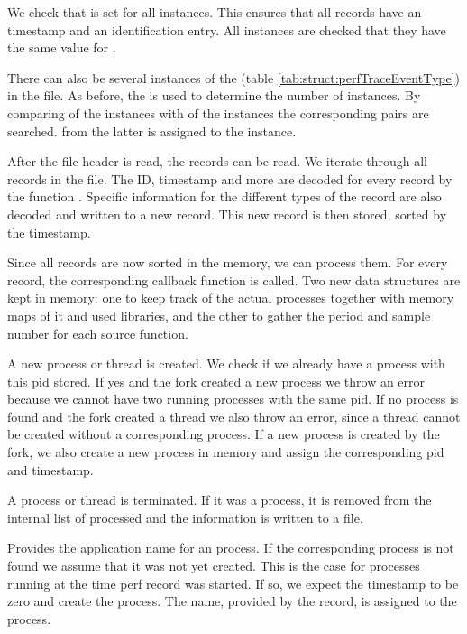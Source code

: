 We check that  is set for all instances. This ensures that all records have an timestamp and an identification entry. All instances are checked that they have the same value for .

There can also be several instances of the  (table \ref{tab:struct:perfTraceEventType}) in the file. As before, the  is used to determine the number of instances. By comparing  of the  instances with  of the  instances the corresponding pairs are search\-ed.  from the latter is assigned to the  instance.

After the file header is read, the records can be read. We iterate through all records in the file. The ID, timestamp and more are decoded for every record by the function . Specific information for the different types of the record are also decoded and written to a new record. This new record is then stored, sorted by the timestamp.

Since all records are now sorted in the memory, we can process them. For every record, the corresponding callback function is called. Two new data structures are kept in memory: one to keep track of the actual processes together with memory maps of it and used libraries, and the other to gather the period and sample number for each source function.

A new process or thread is created. We check if we already have a process with this pid stored. If yes and the fork created a new process we throw an error because we cannot have two running processes with the same pid. If no process is found and the fork created a thread we also throw an error, since a thread cannot be created without a corresponding process.
If a new process is created by the fork, we also create a new process in memory and assign the corresponding pid and timestamp.

A process or thread is terminated. If it was a process, it is removed from the internal list of processed and the information is written to a file.

Provides the application name for an process. If the corresponding process is not found we assume that it was not yet created. This is the case for processes running at the time perf record was started. If so, we expect the timestamp to be zero and create the process. The name, provided by the record, is assigned to the process.

